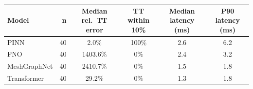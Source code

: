 \begin{tabular}{lrcccc}
\hline
Model & n & Median rel.\ TT error & TT within 10\% & Median latency (ms) & P90 latency (ms) \\
\hline
PINN & 40 & 2.0\% & 100\% & 2.6 & 6.2 \\
FNO & 40 & 1403.6\% & 0\% & 2.4 & 3.2 \\
MeshGraphNet & 40 & 2410.7\% & 0\% & 1.5 & 1.8 \\
Transformer & 40 & 29.2\% & 0\% & 1.3 & 1.8 \\
\hline
\end{tabular}
